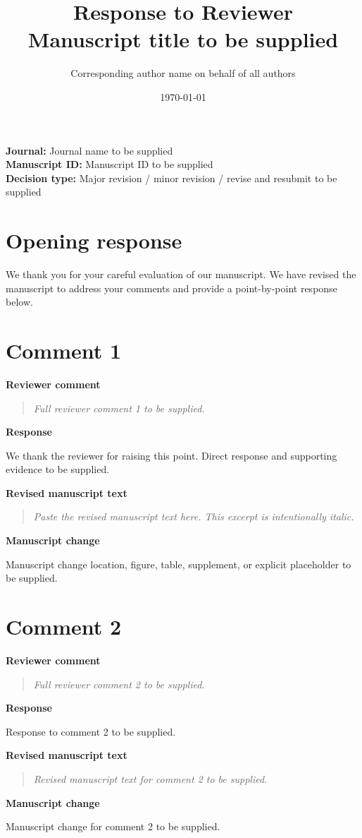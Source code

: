 \documentclass[11pt]{article}
\title{Response to Reviewer\\
\large Manuscript title to be supplied}
\author{Corresponding author name on behalf of all authors}
\date{\today}
\newcommand{\ReviewerComment}[1]{%
  \par\noindent\textbf{Reviewer comment}\par
  \begin{quote}\itshape #1\end{quote}
}
\newcommand{\AuthorResponse}[1]{%
  \par\noindent\textbf{Response}\par
  #1\par
}
\newcommand{\RevisedExcerpt}[1]{%
  \par\noindent\textbf{Revised manuscript text}\par
  \begin{quote}\itshape #1\end{quote}
}
\newcommand{\ManuscriptChange}[1]{%
  \par\noindent\textbf{Manuscript change}\par
  #1\par
}
\begin{document}
\maketitle

\noindent\textbf{Journal:} Journal name to be supplied\\
\textbf{Manuscript ID:} Manuscript ID to be supplied\\
\textbf{Decision type:} Major revision / minor revision / revise and resubmit to be supplied

\section*{Opening response}

We thank you for your careful evaluation of our manuscript.
We have revised the manuscript to address your comments and provide a
point-by-point response below.

\section*{Comment 1}
\ReviewerComment{Full reviewer comment 1 to be supplied.}
\AuthorResponse{We thank the reviewer for raising this point. Direct response and supporting evidence to be supplied.}
\RevisedExcerpt{Paste the revised manuscript text here. This excerpt is intentionally italic.}
\ManuscriptChange{Manuscript change location, figure, table, supplement, or explicit placeholder to be supplied.}

\section*{Comment 2}
\ReviewerComment{Full reviewer comment 2 to be supplied.}
\AuthorResponse{Response to comment 2 to be supplied.}
\RevisedExcerpt{Revised manuscript text for comment 2 to be supplied.}
\ManuscriptChange{Manuscript change for comment 2 to be supplied.}
\end{document}
